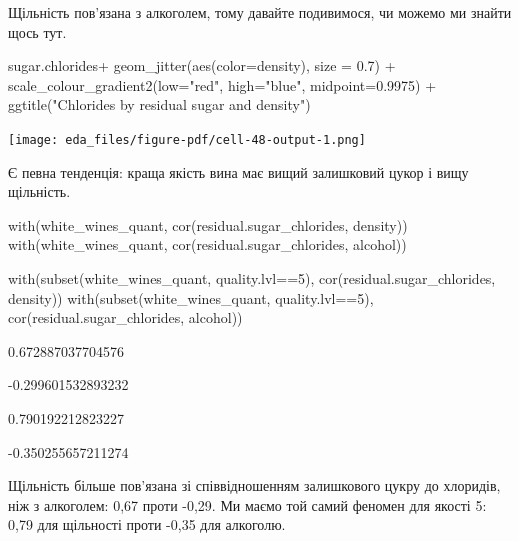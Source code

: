 \documentclass[
  letterpaper,
  DIV=11,
  numbers=noendperiod]{scrreprt}
\newenvironment{Shaded}{\begin{snugshade}}{\end{snugshade}}
\newcommand{\AttributeTok}[1]{\textcolor[rgb]{0.40,0.45,0.13}{#1}}
\newcommand{\DecValTok}[1]{\textcolor[rgb]{0.68,0.00,0.00}{#1}}
\newcommand{\FloatTok}[1]{\textcolor[rgb]{0.68,0.00,0.00}{#1}}
\newcommand{\FunctionTok}[1]{\textcolor[rgb]{0.28,0.35,0.67}{#1}}
\newcommand{\NormalTok}[1]{\textcolor[rgb]{0.00,0.23,0.31}{#1}}
\newcommand{\SpecialCharTok}[1]{\textcolor[rgb]{0.37,0.37,0.37}{#1}}
\newcommand{\StringTok}[1]{\textcolor[rgb]{0.13,0.47,0.30}{#1}}
\begin{document}
Щільність пов'язана з алкоголем, тому давайте подивимося, чи можемо ми
знайти щось тут.

\begin{Shaded}
\begin{Highlighting}[]
\NormalTok{sugar.chlorides}\SpecialCharTok{+}
  \FunctionTok{geom\_jitter}\NormalTok{(}\FunctionTok{aes}\NormalTok{(}\AttributeTok{color=}\NormalTok{density), }\AttributeTok{size =} \FloatTok{0.7}\NormalTok{) }\SpecialCharTok{+}
  \FunctionTok{scale\_colour\_gradient2}\NormalTok{(}\AttributeTok{low=}\StringTok{"red"}\NormalTok{, }\AttributeTok{high=}\StringTok{"blue"}\NormalTok{, }\AttributeTok{midpoint=}\FloatTok{0.9975}\NormalTok{) }\SpecialCharTok{+}
  \FunctionTok{ggtitle}\NormalTok{(}\StringTok{"Chlorides by residual sugar and density"}\NormalTok{)}
\end{Highlighting}
\end{Shaded}

\texttt{[image: eda\_files/figure-pdf/cell-48-output-1.png]}

Є певна тенденція: краща якість вина має вищий залишковий цукор і вищу
щільність.

\begin{Shaded}
\begin{Highlighting}[]
\FunctionTok{with}\NormalTok{(white\_wines\_quant, }\FunctionTok{cor}\NormalTok{(residual.sugar\_chlorides, density))}
\FunctionTok{with}\NormalTok{(white\_wines\_quant, }\FunctionTok{cor}\NormalTok{(residual.sugar\_chlorides, alcohol))}


\FunctionTok{with}\NormalTok{(}\FunctionTok{subset}\NormalTok{(white\_wines\_quant, quality.lvl}\SpecialCharTok{==}\DecValTok{5}\NormalTok{),}
     \FunctionTok{cor}\NormalTok{(residual.sugar\_chlorides, density))}
\FunctionTok{with}\NormalTok{(}\FunctionTok{subset}\NormalTok{(white\_wines\_quant, quality.lvl}\SpecialCharTok{==}\DecValTok{5}\NormalTok{),}
     \FunctionTok{cor}\NormalTok{(residual.sugar\_chlorides, alcohol))}
\end{Highlighting}
\end{Shaded}

0.672887037704576

-0.299601532893232

0.790192212823227

-0.350255657211274

Щільність більше пов'язана зі співвідношенням залишкового цукру до
хлоридів, ніж з алкоголем: 0,67 проти -0,29. Ми маємо той самий феномен
для якості 5: 0,79 для щільності проти -0,35 для алкоголю.
\end{document}
